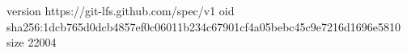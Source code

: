version https://git-lfs.github.com/spec/v1
oid sha256:1dcb765d0dcb4857ef0c06011b234c67901cf4a05bebc45c9e7216d1696e5810
size 22004
